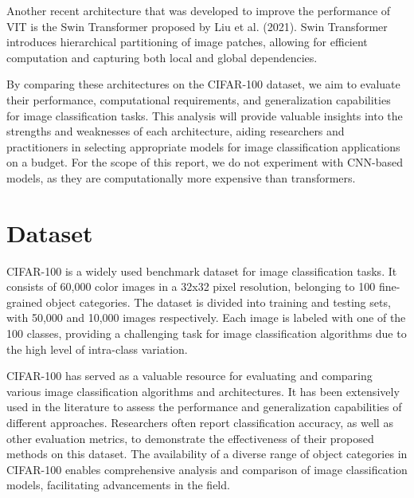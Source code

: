 \documentclass{article}
\begin{document}

Another recent architecture that was developed to improve the performance of VIT is the Swin Transformer proposed by Liu et al. (2021).
Swin Transformer introduces hierarchical partitioning of image patches, allowing for efficient computation and capturing both local and global dependencies.

By comparing these architectures on the CIFAR-100 dataset, we aim to evaluate their performance, computational requirements, and generalization capabilities for image classification tasks.
This analysis will provide valuable insights into the strengths and weaknesses of each architecture, aiding researchers and practitioners in selecting appropriate models for image classification applications on a budget.
For the scope of this report, we do not experiment with CNN-based models, as they are computationally more expensive than transformers.

\section{Dataset}
CIFAR-100 \cite{Krizhevsky09learningmultiple} is a widely used benchmark dataset for image classification tasks.
It consists of 60,000 color images in a 32x32 pixel resolution, belonging to 100 fine-grained object categories.
The dataset is divided into training and testing sets, with 50,000 and 10,000 images respectively.
Each image is labeled with one of the 100 classes, providing a challenging task for image classification algorithms due to the high level of intra-class variation.

CIFAR-100 has served as a valuable resource for evaluating and comparing various image classification algorithms and architectures.
It has been extensively used in the literature to assess the performance and generalization capabilities of different approaches.
Researchers often report classification accuracy, as well as other evaluation metrics, to demonstrate the effectiveness of their proposed methods on this dataset.
The availability of a diverse range of object categories in CIFAR-100 enables comprehensive analysis and comparison of image classification models, facilitating advancements in the field.
\end{document}
